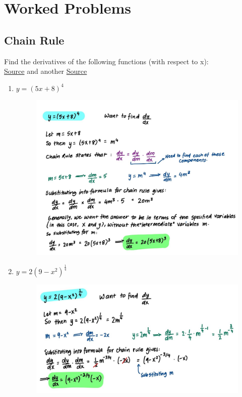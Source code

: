 \documentclass{article}
\begin{document}
\pagebreak
\section*{Worked Problems}
\label{WorkedProblems}

\subsection*{Chain Rule}
Find the derivatives of the following functions (with respect to x):
\\ \href{https://mryangteacher.weebly.com/uploads/7/7/0/2/7702250/2.4_chain_rule_practice_ws_1.pdf}{Source} and another \href{https://tajimasolis.weebly.com/uploads/3/7/3/4/37346235/chain_rule_worksheet_1_and_2.pdf}{Source}

\begin{enumerate}
    \item $y = (5x+8)^4$
    \begin{figure}[H]
        \centering
        \includegraphics[width=0.78 \linewidth]{Q1.jpg}
        \label{fig:Q1}
    \end{figure}
    \item $y = 2(9-x^2)^\frac{1}{4}$
    \begin{figure}[H]
        \centering
        \includegraphics[width=0.78 \linewidth]{Q2.jpg}

\end{figure}
\end{enumerate}
\end{document}
